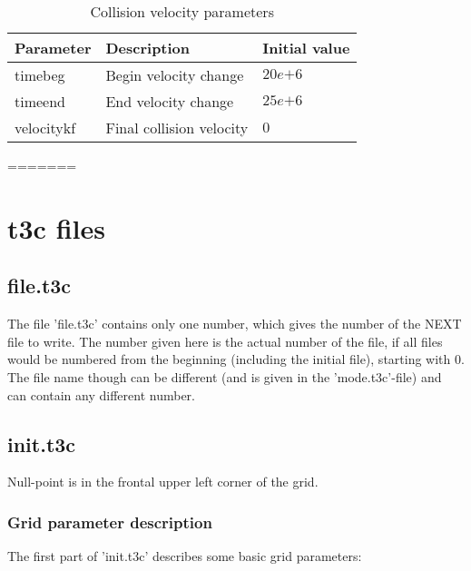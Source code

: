 \begin{table}[H]
\small
\centering
\begin{tabular}{l l l}
\toprule
Parameter & Description & Initial value \\
\midrule
timebeg 	& Begin velocity change & $20e{+6}$\\
timeend 	& End velocity change & $25e{+6}$\\
velocitykf 	& Final collision velocity & $0$\\
\bottomrule
\end{tabular}
\caption{Collision velocity parameters}
\label{tbl:mode_collision_parameters}
=======

\section{t3c files}

\subsection{file.t3c}
The file 'file.t3c' contains only one number, which gives the number of the NEXT file to write.
The number given here is the actual number of the file, if all files would be numbered from the beginning (including the initial file), starting with 0.
The file name though can be different (and is given in the 'mode.t3c'-file) and can contain any different number.

\subsection{init.t3c}
Null-point is in the frontal upper left corner of the grid.

\subsubsection{Grid parameter description}

The first part of 'init.t3c' describes some basic grid parameters:


\end{table}
